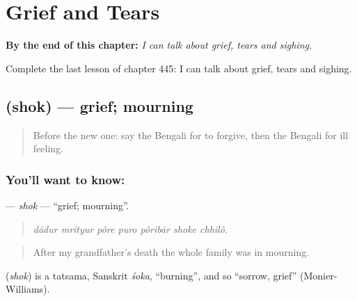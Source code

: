 
\chapter{Grief and Tears}
\label{ch:bn-grief-and-tears}

\begin{chapteropening}
\textbf{By the end of this chapter:} \emph{I can talk about grief, tears and sighing.}

Complete the last lesson of chapter 445: I can talk about grief, tears and sighing.
\end{chapteropening}

\section[\texorpdfstring{\bn{শোক} (shok)}{শোক (shok)}]{ (shok) — grief; mourning}

\label{lesson:BN-C445-shok}



\begin{quote}
Before the new one: say the Bengali for to forgive, then the Bengali for ill feeling.
\end{quote}

\subsection*{You'll want to know: }
\textbf{} — \emph{shok} — \textquotedblleft{}grief; mourning\textquotedblright{}.

\begin{quote}
      
\end{quote}

\begin{quote}
\emph{dādur mrityur pôre puro pôribār shoke chhilô.}
\end{quote}

\begin{quote}
After my grandfather's death the whole family was in mourning.
\end{quote}

\begin{cousinweb}
\textbf{} (\emph{shok}) is a tatsama, Sanskrit \emph{śoka}, \textquotedblleft{}burning\textquotedblright{}, and so \textquotedblleft{}sorrow, grief\textquotedblright{} (Monier-Williams).
\end{cousinweb}

